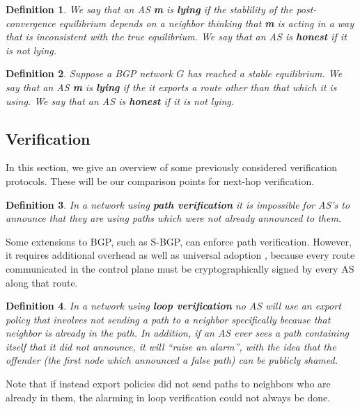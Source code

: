 \documentclass[10pt]{article}
\newtheorem{definition}{Definition}
\begin{document}
    \begin{definition}
      We say that an AS \textbf{m} is \textbf{lying} if the
      stablility of the post-convergence equilibrium depends on a neighbor
      thinking that \textbf{m} is acting in a way that is inconsistent with the
      true equilibrium.
      We say that an AS is \textbf{honest} if it is not lying.
    \end{definition}
    \begin{definition}
      Suppose a BGP network $G$ has reached a stable equilibrium.
      We say that an AS \textbf{m} is \textbf{lying} if the
      it exports a route other than that which it is using.
      We say that an AS is \textbf{honest} if it is not lying.
    \end{definition}


  \subsection{Verification}
    In this section, we give an overview of some previously considered 
    verification protocols. These will be our comparison points for next-hop
    verification.

    \begin{definition} 
      In a network using \textbf{path verification} it is
      impossible for AS's to announce that they are using paths which were not
      already announced to them.
    \end{definition}

    Some extensions to BGP, such as S-BGP, can enforce path verification.
    However, it requires additional overhead as well as universal adoption
    \cite{PartialDeploy}, because every route communicated in the control plane
    must be cryptographically signed by every AS along that route.

    \begin{definition}
      In a network using \textbf{loop verification} no AS will
      use an export policy that involves not sending a path to a neighbor
      specifically because that neighbor is already in the path.
      In addition, if
      an AS ever sees a path containing itself that it did not announce, it will
      ``raise an alarm'', with the idea that the offender (the first
      node which announced a false path) can be publicly shamed.
    \end{definition}

    Note that if instead export policies did not send paths to neighbors who are
    already in them, the alarming in loop verification could not always be done.
\end{document}
